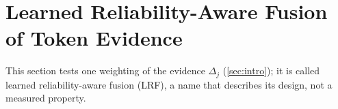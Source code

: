 
\section{Learned Reliability-Aware Fusion of Token Evidence}\label{sec:study2}
This section tests one weighting of the evidence $\Delta_j$ (\cref{sec:intro}); it is called learned reliability-aware fusion
(LRF), a name that describes its design, not a measured property.

